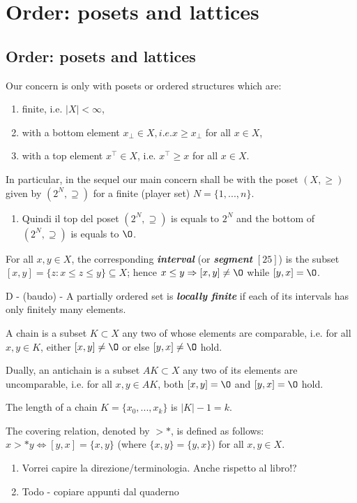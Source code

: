 \chapter{Order: posets and lattices}
\section{Order: posets and lattices}



	
	Our concern is only with posets or ordered structures which are:
	  \begin{enumerate}
	    \item finite, i.e. $|X|<\infty$,
	    \item with a bottom element $x_{\bot} \in X, i.e. x \ge x_{\bot}$ for all $x \in X$,
	    \item with a top element $x^{\top} \in X$, i.e. $x^{\top} \ge x$ for all $x \in X$.
	  \end{enumerate}
	  In particular, in the sequel our main concern shall be with the poset $(X, \ge)$ given by $(2^N, \supseteq)$ for a finite (player set) $N = \{1,...,n\}$.
	    \begin{enumerate}
	     \item Quindi il top del poset $(2^N, \supseteq)$ is equals to $2^N$ and the bottom of $(2^N, \supseteq)$ is equals to $\O$. 
	    \end{enumerate}
	    
	
	
	For all $x, y \in X$, the corresponding \emph{\bfseries{interval}} (or \emph{\bfseries{segment}} $[25]$) is the subset $[x,y]=\{z:x \le z \le y\} \subseteq X$; hence $x \le y \Rightarrow [x,y] \ne \O$ while $[y,x] = \O$.
	
	D - (baudo) - A partially ordered set is \emph{\bf{locally finite}} if each of its intervals has only finitely many elements.
	
	A chain is a subset $K \subset X$ any two of whose elements are comparable, i.e. for all $x, y \in K$, either $[x,y] \ne \O$ or else $[y,x] \ne \O$ hold.
	
	Dually, an antichain is a subset $AK \subset X$ any two of its elements are uncomparable, i.e. for all $x,y \in AK$, both $[x,y]=\O$ and $[y,x]=\O$ hold.
	
	The length of a chain $K = \{x_0,...,x_k\}$ is $|K|-1=k$.

	The covering relation, denoted by $>*$, is defined as follows: \\
	      $x>*y \Leftrightarrow [y,x]=\{x,y\}$ (where $\{x,y\} = \{y,x\}$) for all $x,y \in X$.
		  \begin{enumerate}
		   \item Vorrei capire la direzione/terminologia. Anche rispetto al libro!?
		   \item Todo - copiare appunti dal quaderno
		  \end{enumerate}
	
